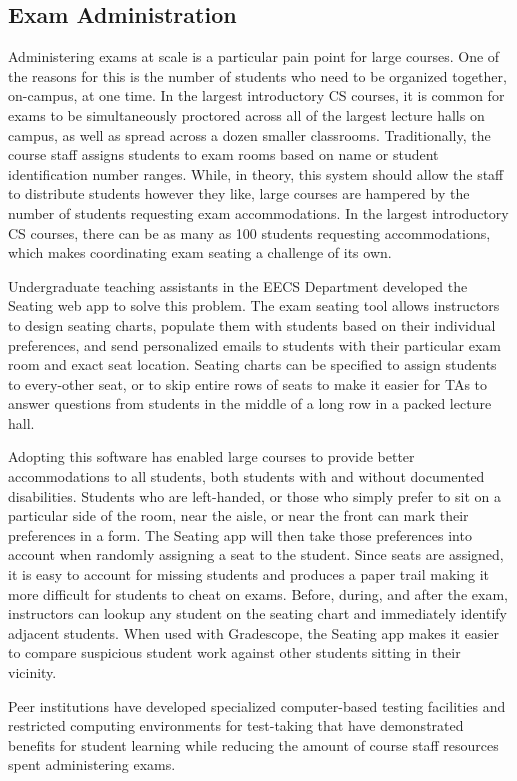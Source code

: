 \subsection{Exam Administration}

Administering exams at scale is a particular pain point for large courses. One of the reasons for this is the number of students who need to be organized together, on-campus, at one time. In the largest introductory CS courses, it is common for exams to be simultaneously proctored across all of the largest lecture halls on campus, as well as spread across a dozen smaller classrooms. Traditionally, the course staff assigns students to exam rooms based on name or student identification number ranges. While, in theory, this system should allow the staff to distribute students however they like, large courses are hampered by the number of students requesting exam accommodations. In the largest introductory CS courses, there can be as many as 100 students requesting accommodations, which makes coordinating exam seating a challenge of its own.

Undergraduate teaching assistants in the EECS Department developed the Seating web app to solve this problem. The exam seating tool allows instructors to design seating charts, populate them with students based on their individual preferences, and send personalized emails to students with their particular exam room and exact seat location. Seating charts can be specified to assign students to every-other seat, or to skip entire rows of seats to make it easier for TAs to answer questions from students in the middle of a long row in a packed lecture hall.

Adopting this software has enabled large courses to provide better accommodations to all students, both students with and without documented disabilities. Students who are left-handed, or those who simply prefer to sit on a particular side of the room, near the aisle, or near the front can mark their preferences in a form. The Seating app will then take those preferences into account when randomly assigning a seat to the student. Since seats are assigned, it is easy to account for missing students and produces a paper trail making it more difficult for students to cheat on exams. Before, during, and after the exam, instructors can lookup any student on the seating chart and immediately identify adjacent students. When used with Gradescope, the Seating app makes it easier to compare suspicious student work against other students sitting in their vicinity.

Peer institutions have developed specialized computer-based testing facilities \cite{Nip:2018, West:2016} and restricted computing environments for test-taking \cite{Piech:2018} that have demonstrated benefits for student learning while reducing the amount of course staff resources spent administering exams.